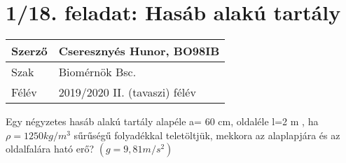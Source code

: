 \section*{1/18. feladat: Hasáb alakú tartály}
\begin{tabular}{ | p{2cm} | p{14cm} | } 
	\hline 
	Szerző & Cseresznyés Hunor, BO98IB \\
	\hline
	Szak & Biomérnök Bsc. \\
	\hline	Félév & 2019/2020 II. (tavaszi) félév  \\
	\hline
\end{tabular}
\vspace{0.5cm}

\noindent Egy négyzetes hasáb alakú tartály alapéle a= 60 cm, oldaléle l=2 m , ha $\rho= 1250  kg/m^3$ sűrűségű folyadékkal teletöltjük, mekkora az alaplapjára és az oldalfalára ható erő? $(g=9,81 m/s^2)$

